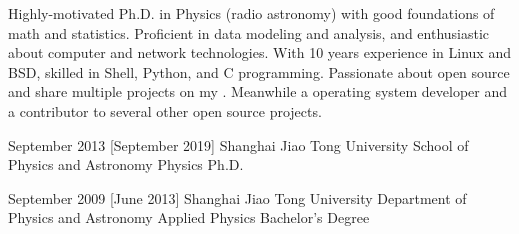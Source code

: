 \documentclass{resume}
\begin{document}
\makeheader

Highly-motivated Ph.D. in Physics (radio astronomy)
with good foundations of math and statistics.
Proficient in data modeling and analysis,
and enthusiastic about computer and network technologies.
With 10 years experience in Linux and BSD,
skilled in Shell, Python, and C programming.
Passionate about open source and share multiple projects on my
.
Meanwhile a 
operating system developer and a contributor to several other
open source projects.

\begin{competences}[10em]
\end{competences}

\begin{educations}
  \education%
    {September 2013}%
    [September 2019]%
    {Shanghai Jiao Tong University}%
    {School of Physics and Astronomy}%
    {Physics}%
    {Ph.D.}

  \separator{0.5ex}
  \education%
    {September 2009}%
    [June 2013]%
    {Shanghai Jiao Tong University}%
    {Department of Physics and Astronomy}%
    {Applied Physics}%
    {Bachelor's Degree}
\end{educations}
\end{document}
